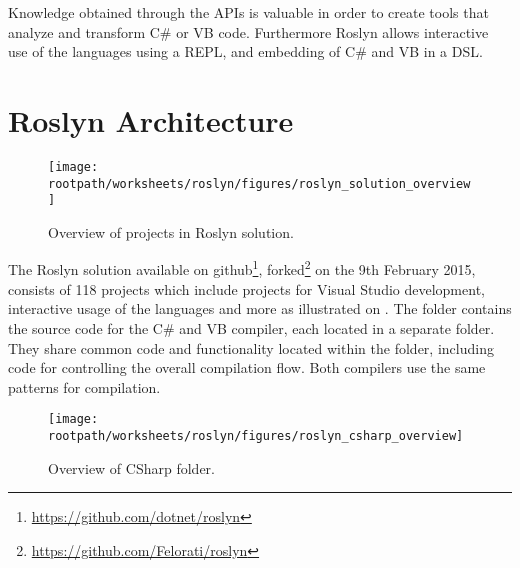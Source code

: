 Knowledge obtained through the \acp{API} is valuable in order to create tools that analyze and transform C\# or \ac{VB} code. Furthermore Roslyn allows interactive use of the languages using a \ac{REPL}\cite{cSharp2012interactive}, and embedding of  C\# and \ac{VB} in a \ac{DSL}\cite[p. 3]{ng2012roslyn}.


\section{Roslyn Architecture}\label{sec:roslyn_archi}
\begin{figure}[htbp]
\centering
\texttt{[image: \\rootpath/worksheets/roslyn/figures/roslyn\_solution\_overview]}
\caption{Overview of projects in Roslyn solution.}
\label{fig:roslyn_solution_overview}
\end{figure}

The Roslyn solution available on github\footnote{\url{https://github.com/dotnet/roslyn}}, forked\footnote{\url{https://github.com/Felorati/roslyn}} on the 9th February 2015, consists of 118 projects which include projects for Visual Studio development, interactive usage of the languages and more as illustrated on . The  folder contains the source code for the C\# and \ac{VB} compiler, each located in a separate folder. They share common code and functionality located within the  folder, including code for controlling the overall compilation flow. Both compilers use the same patterns for compilation\cite[09:36-10:36]{campbellDeeperRos}.

\begin{figure}[htbp]
\centering
\texttt{[image: \\rootpath/worksheets/roslyn/figures/roslyn\_csharp\_overview]}
\caption{Overview of CSharp folder.}
\label{fig:roslyn_csharp_overview}
\end{figure}

